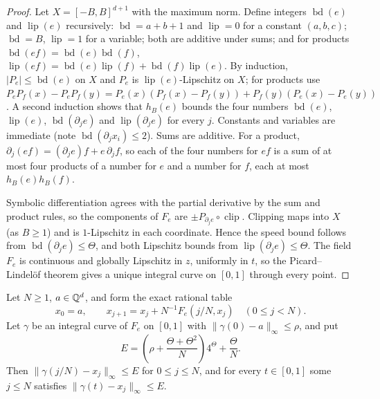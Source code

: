 \begin{proof}
Let $X=[-B,B]^{d+1}$ with the maximum norm. Define integers $\operatorname{bd}(e)$ and $\operatorname{lip}(e)$
recursively: $\operatorname{bd}=a+b+1$ and $\operatorname{lip}=0$ for a constant $(a,b,c)$; $\operatorname{bd}=B$,
$\operatorname{lip}=1$ for a variable; both are additive under sums; and for products
$\operatorname{bd}(ef)=\operatorname{bd}(e)\operatorname{bd}(f)$,
$\operatorname{lip}(ef)=\operatorname{bd}(e)\operatorname{lip}(f)+\operatorname{bd}(f)\operatorname{lip}(e)$. By
induction, $|P_e|\le\operatorname{bd}(e)$ on $X$ and $P_e$ is $\operatorname{lip}(e)$-Lipschitz on $X$; for products
use $P_eP_f(x)-P_eP_f(y)=P_e(x)(P_f(x)-P_f(y))+P_f(y)(P_e(x)-P_e(y))$. A second induction shows that $h_B(e)$
bounds the four numbers $\operatorname{bd}(e)$, $\operatorname{lip}(e)$, $\operatorname{bd}(\partial_je)$ and
$\operatorname{lip}(\partial_je)$ for every $j$. Constants and variables are immediate (note
$\operatorname{bd}(\partial_jx_i)\le2$). Sums are additive. For a product,
$\partial_j(ef)=(\partial_je)f+e\,\partial_jf$, so each of the four numbers for $ef$ is a sum of at most four
products of a number for $e$ and a number for $f$, each at most $h_B(e)h_B(f)$.

Symbolic differentiation agrees with the partial derivative by the sum and product rules, so the components of $F_e$
are $\pm P_{\partial_je}\circ\operatorname{clip}$. Clipping maps into $X$ (as $B\ge1$) and is $1$-Lipschitz in each
coordinate. Hence the speed bound follows from $\operatorname{bd}(\partial_je)\le\Theta$, and both Lipschitz bounds
from $\operatorname{lip}(\partial_je)\le\Theta$. The field $F_e$ is continuous and globally Lipschitz in $z$,
uniformly in $t$, so the Picard--Lindel\"of theorem gives a unique integral curve on $[0,1]$ through every point.
\end{proof}

\begin{lemma}\label{lem:certificate-euler}
Let $N\ge1$, $a\in\mathbb{Q}^d$, and form the exact rational table
\[
 x_0=a,\qquad x_{j+1}=x_j+N^{-1}F_e(j/N,x_j)\quad(0\le j<N).
\]
Let $\gamma$ be an integral curve of $F_e$ on $[0,1]$ with $\|\gamma(0)-a\|_\infty\le\rho$, and put
\begin{equation}\label{eq:certificate-error}
 E=\left(\rho+\frac{\Theta+\Theta^2}{N}\right)4^\Theta+\frac{\Theta}{N}.
\end{equation}
Then $\|\gamma(j/N)-x_j\|_\infty\le E$ for $0\le j\le N$, and for every $t\in[0,1]$ some $j\le N$ satisfies
$\|\gamma(t)-x_j\|_\infty\le E$.
\end{lemma}

